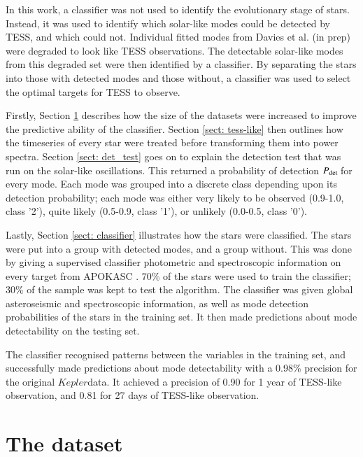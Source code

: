 \documentclass[a4paper,fleqn,usenatbib,useAMS]{mnras}
\newcommand{\kep}{\ensuremath{Kepler}\:}
\newcommand{\pdet}{\ensuremath{P_{\rm det}\:}}
\begin{document}
In this work, a classifier was not used to identify the evolutionary stage of stars. Instead, it was used to identify which solar-like modes could be detected by TESS, and which could not. Individual fitted modes from Davies et al. (in prep) were degraded to look like TESS observations. The detectable solar-like modes from this degraded set were then identified by a classifier. By separating the stars into those with detected modes and those without, a classifier was used to select the optimal targets for TESS to observe.

Firstly, Section \ref{sect: dataset} describes how the size of the datasets were increased to improve the predictive ability of the classifier. Section \ref{sect: tess-like} then outlines how the timeseries of every star were treated before transforming them into power spectra. Section \ref{sect: det_test} goes on to explain the detection test that was run on the solar-like oscillations. This returned a probability of detection \pdet for every mode. Each mode was grouped into a discrete class depending upon its detection probability; each mode was either very likely to be observed (0.9-1.0, class '2'), quite likely (0.5-0.9, class '1'), or unlikely (0.0-0.5, class '0').

Lastly, Section \ref{sect: classifier} illustrates how the stars were classified. The stars were put into a group with detected modes, and a group without. This was done by giving a supervised classifier photometric and spectroscopic information on every target from APOKASC \citep{pinsonneault_apokasc_2014}. 70\% of the stars were used to train the classifier; 30\% of the sample was kept to test the algorithm. The classifier was given global asteroseismic and spectroscopic information, as well as mode detection probabilities of the stars in the training set. It then made predictions about mode detectability on the testing set.

The classifier recognised patterns between the variables in the training set, and successfully made predictions about mode detectability with a 0.98\% precision for the original \kep data. It achieved a precision of 0.90 for 1 year of TESS-like observation, and 0.81 for 27 days of TESS-like observation.
\fi


\section{The dataset}
\label{sect: dataset}
\end{document}
